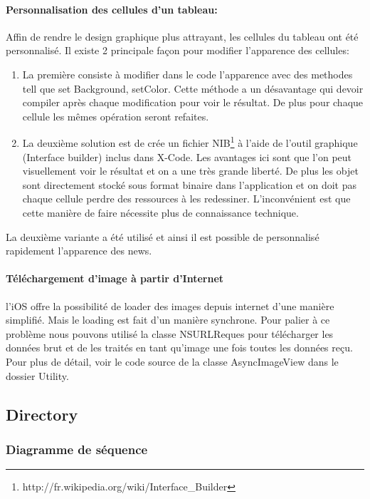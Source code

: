 			\paragraph{Personnalisation des cellules d'un tableau:}Affin de rendre le design graphique plus attrayant, les cellules du tableau  ont été personnalisé. Il existe 2 principale façon pour modifier l'apparence des cellules:
		 	\begin{enumerate}
		 	\item La première consiste à modifier dans le code l'apparence avec des methodes tell que set Background, setColor. Cette méthode a un désavantage qui devoir compiler après chaque modification pour voir le résultat. De plus pour chaque cellule les mêmes opération seront refaites.
		 	\item La deuxième solution est de crée un fichier NIB\footnote{http://fr.wikipedia.org/wiki/Interface\_Builder} à l'aide de l'outil graphique (Interface builder) inclus dans X-Code. Les avantages ici sont que l'on peut visuellement voir le résultat et on a une très grande liberté. De plus les objet sont directement stocké sous format binaire dans l'application et on doit pas chaque cellule perdre des ressources à les redessiner. L'inconvénient est que cette manière de faire nécessite plus de connaissance technique. 
		 	\end{enumerate}
			La deuxième variante a été utilisé et ainsi il est possible de personnalisé rapidement l'apparence des news.
			
			\paragraph{Téléchargement d'image à partir d'Internet} l'iOS offre la possibilité de loader des images depuis internet d'une manière simplifié. Mais le loading est fait d'un manière synchrone. Pour palier à ce problème nous pouvons utilisé la classe NSURLReques pour télécharger les données brut et de les traités en tant qu'image une fois toutes les données reçu. Pour plus de détail, voir le code source de la classe AsyncImageView dans le dossier Utility. 
			
	\subsection{Directory}
					\subsubsection*{Diagramme de séquence}

